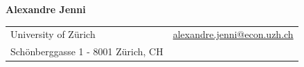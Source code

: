 \documentclass[a4,11pt,oneside]{article}
\begin{document}

\noindent  \LARGE{\textbf{Alexandre Jenni}}  \\
\vspace{-2.5ex}
\normalsize


\begin{center}
\begin{tabular}{l l}
 University of Z\"{u}rich   & \hspace{.5in} \href{alexandre.jenni@econ.uzh.ch}{alexandre.jenni@econ.uzh.ch} \\
Sch\"{o}nberggasse 1 -  8001 Z\"{u}rich, CH      & \hspace{.5in}   \\
\end{tabular}
\end{center}
\end{document}
